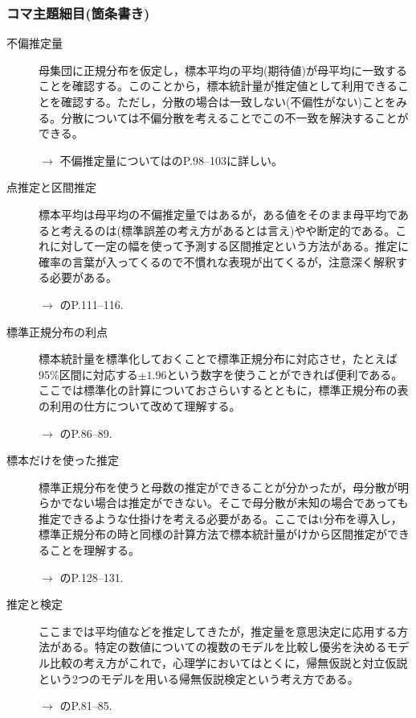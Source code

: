 \subsubsection{コマ主題細目(箇条書き)}
\begin{description}

	\item[不偏推定量]母集団に正規分布を仮定し，標本平均の平均(期待値)が母平均に一致することを確認する。このことから，標本統計量が推定値として利用できることを確認する。ただし，分散の場合は一致しない(不偏性がない)ことをみる。分散については不偏分散を考えることでこの不一致を解決することができる。
	      \begin{flushright}
		      $\to$ 不偏推定量については\citet{Yamada2004}のP.98--103に詳しい。
	      \end{flushright}

	\item[点推定と区間推定]標本平均は母平均の不偏推定量ではあるが，ある値をそのまま母平均であると考えるのは(標準誤差の考え方があるとは言え)やや断定的である。これに対して一定の幅を使って予測する区間推定という方法がある。推定に確率の言葉が入ってくるので不慣れな表現が出てくるが，注意深く解釈する必要がある。
	      \begin{flushright}
		      $\to$ \citet{Kawabata201408}のP.111--116.
	      \end{flushright}

	\item[標準正規分布の利点]標本統計量を標準化しておくことで標準正規分布に対応させ，たとえば95\%区間に対応する$\pm 1.96$という数字を使うことができれば便利である。ここでは標準化の計算についておさらいするとともに，標準正規分布の表の利用の仕方について改めて理解する。
	      \begin{flushright}
		      $\to$ \citet{Yamada2004}のP.86--89.
	      \end{flushright}

	\item[標本だけを使った推定]標準正規分布を使うと母数の推定ができることが分かったが，母分散が明らかでない場合は推定ができない。そこで母分散が未知の場合であっても推定できるような仕掛けを考える必要がある。ここではt分布を導入し，標準正規分布の時と同様の計算方法で標本統計量がけから区間推定ができることを理解する。

	      \begin{flushright}
		      $\to$ \citet{Yamada2004}のP.128--131.
	      \end{flushright}


	\item[推定と検定]ここまでは平均値などを推定してきたが，推定量を意思決定に応用する方法がある。特定の数値についての複数のモデルを比較し優劣を決めるモデル比較の考え方がこれで，心理学においてはとくに，帰無仮説と対立仮説という2つのモデルを用いる帰無仮説検定という考え方である。
	      \begin{flushright}
		      $\to$ \citet{Kawabata201408}のP.81--85.
	      \end{flushright}


\end{description}

